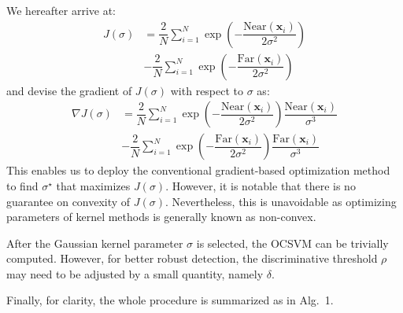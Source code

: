 \documentclass[conference]{IEEEtran}
\begin{document}
We hereafter arrive at:
\begin{align}
J (\sigma) &=\dfrac{2}{N} \sum _{i=1}^N \exp \left( - \dfrac{\text{Near} \left( \mathbf{x}_i \right)}{2 \sigma^2} \right) \nonumber \\
& - \dfrac{2}{N} \sum _{i=1}^N \exp \left( - \dfrac{\text{Far} \left( \mathbf{x}_i \right)}{2 \sigma^2}\right) \label{eq:Js}
\end{align}
and devise the gradient of $J (\sigma)$ with respect to $\sigma$ as:
\begin{align}
\nabla J  (\sigma) &= \dfrac{2}{N} \sum _{i=1}^N \exp \left( -\dfrac{\text{Near} \left( \mathbf{x}_i \right)}{2 \sigma^2}\right) \dfrac{\text{Near} \left( \mathbf{x}_i \right)}{\sigma^3} \nonumber \\
& - \dfrac{2}{N} \sum _{i=1}^N \exp \left( -\dfrac{\text{Far} \left( \mathbf{x}_i \right)}{2 \sigma^2}\right) \dfrac{\text{Far} \left( \mathbf{x}_i \right)}{\sigma^3} \label{eq:dJds}
\end{align}
This enables us to deploy the conventional gradient-based optimization method to find $\sigma^\star$ that maximizes $J(\sigma)$. However, it is notable that there is no guarantee on convexity of $J(\sigma)$. Nevertheless, this is unavoidable as optimizing parameters of kernel methods is generally known as non-convex. 

After the Gaussian kernel parameter $\sigma$ is selected, the OCSVM can be trivially computed. However, for better robust detection, the discriminative threshold $\rho$ may need to be adjusted by a small quantity, namely $\delta$. 

Finally, for clarity, the whole procedure is summarized as in Alg.~1.
\end{document}
